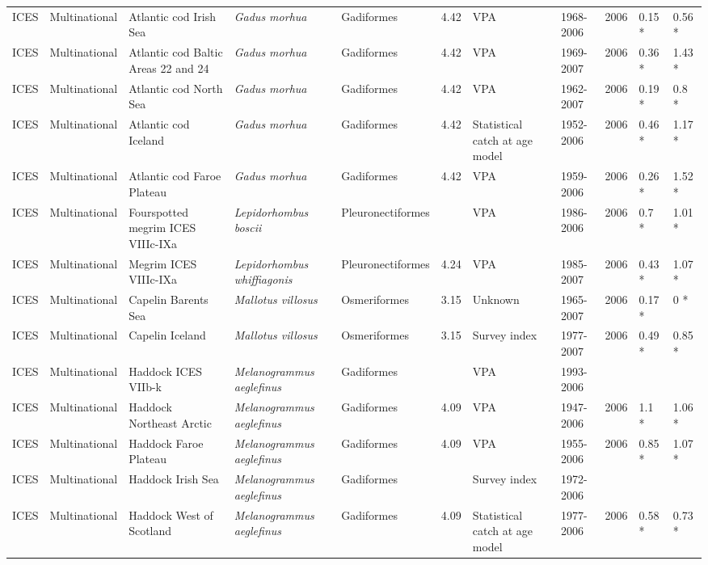 \begin{longtable}{p{1.5cm}p{1.5cm}p{3cm}p{3cm}p{2.5cm}p{0.9cm}p{1.4cm}p{0.9cm}p{0.9cm}p{0.9cm}p{1cm}}
  ICES & Multinational & Atlantic cod Irish Sea & \textit{Gadus morhua} & Gadiformes & 4.42 & VPA & 1968-2006 & 2006 & 0.15 * & 0.56 * \\ 
  ICES & Multinational & Atlantic cod Baltic Areas 22 and 24 & \textit{Gadus morhua} & Gadiformes & 4.42 & VPA & 1969-2007 & 2006 & 0.36 * & 1.43 * \\ 
  ICES & Multinational & Atlantic cod North Sea & \textit{Gadus morhua} & Gadiformes & 4.42 & VPA & 1962-2007 & 2006 & 0.19 * & 0.8 * \\ 
  ICES & Multinational & Atlantic cod Iceland & \textit{Gadus morhua} & Gadiformes & 4.42 & Statistical catch at age model & 1952-2006 & 2006 & 0.46 * & 1.17 * \\ 
  ICES & Multinational & Atlantic cod Faroe Plateau & \textit{Gadus morhua} & Gadiformes & 4.42 & VPA & 1959-2006 & 2006 & 0.26 * & 1.52 * \\ 
  ICES & Multinational & Fourspotted megrim ICES VIIIc-IXa & \textit{Lepidorhombus boscii} & Pleuronectiformes &  & VPA & 1986-2006 & 2006 & 0.7 * & 1.01 * \\ 
  ICES & Multinational & Megrim ICES VIIIc-IXa & \textit{Lepidorhombus whiffiagonis} & Pleuronectiformes & 4.24 & VPA & 1985-2007 & 2006 & 0.43 * & 1.07 * \\ 
  ICES & Multinational & Capelin Barents Sea & \textit{Mallotus villosus} & Osmeriformes & 3.15 & Unknown & 1965-2007 & 2006 & 0.17 * & 0 * \\ 
  ICES & Multinational & Capelin Iceland & \textit{Mallotus villosus} & Osmeriformes & 3.15 & Survey index & 1977-2007 & 2006 & 0.49 * & 0.85 * \\ 
  ICES & Multinational & Haddock ICES VIIb-k & \textit{Melanogrammus aeglefinus} & Gadiformes &  & VPA & 1993-2006 &  &  &  \\ 
  ICES & Multinational & Haddock Northeast Arctic & \textit{Melanogrammus aeglefinus} & Gadiformes & 4.09 & VPA & 1947-2006 & 2006 & 1.1 * & 1.06 * \\ 
  ICES & Multinational & Haddock Faroe Plateau & \textit{Melanogrammus aeglefinus} & Gadiformes & 4.09 & VPA & 1955-2006 & 2006 & 0.85 * & 1.07 * \\ 
  ICES & Multinational & Haddock Irish Sea & \textit{Melanogrammus aeglefinus} & Gadiformes &  & Survey index & 1972-2006 &  &  &  \\ 
  ICES & Multinational & Haddock West of Scotland & \textit{Melanogrammus aeglefinus} & Gadiformes & 4.09 & Statistical catch at age model & 1977-2006 & 2006 & 0.58 * & 0.73 * \\ 

\end{longtable}

